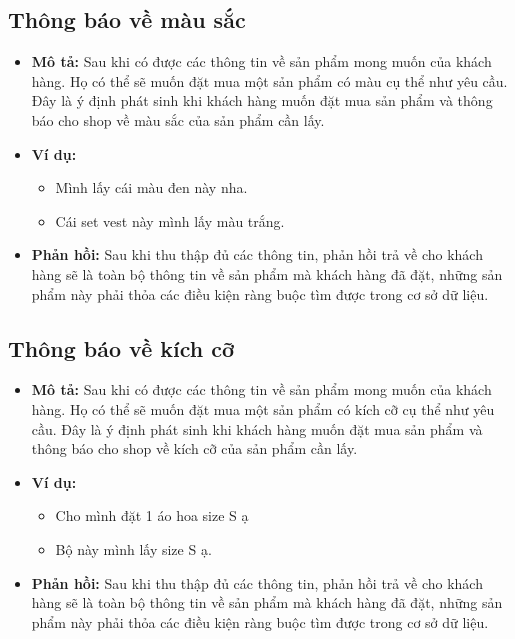 \subsection{Thông báo về màu sắc}
\begin{itemize}
    \item \textbf{Mô tả:} Sau khi có được các thông tin về sản phẩm mong muốn của khách hàng. Họ có thể sẽ muốn đặt mua một sản phẩm có màu cụ thể như yêu cầu. Đây là ý định phát sinh khi khách hàng muốn đặt mua sản phẩm và thông báo cho shop về màu sắc của sản phẩm cần lấy.
    \item \textbf{Ví dụ:}
    \begin{itemize}
        \item Mình lấy cái màu đen này nha.
        \item Cái set vest này mình lấy màu trắng.
    \end{itemize}
    \item \textbf{Phản hồi:} Sau khi thu thập đủ các thông tin, phản hồi trả về cho khách hàng sẽ là toàn bộ thông tin về sản phẩm mà khách hàng đã đặt, những sản phẩm này phải thỏa các điều kiện ràng buộc tìm được trong cơ sở dữ liệu.
\end{itemize}

\subsection{Thông báo về kích cỡ}
\begin{itemize}
    \item \textbf{Mô tả:} Sau khi có được các thông tin về sản phẩm mong muốn của khách hàng. Họ có thể sẽ muốn đặt mua một sản phẩm có kích cỡ cụ thể như yêu cầu. Đây là ý định phát sinh khi khách hàng muốn đặt mua sản phẩm và thông báo cho shop về kích cỡ của sản phẩm cần lấy.
    \item \textbf{Ví dụ:}
    \begin{itemize}
        \item Cho mình đặt 1 áo hoa size S ạ
        \item Bộ này mình lấy size S ạ.
    \end{itemize}
    \item \textbf{Phản hồi:} Sau khi thu thập đủ các thông tin, phản hồi trả về cho khách hàng sẽ là toàn bộ thông tin về sản phẩm mà khách hàng đã đặt, những sản phẩm này phải thỏa các điều kiện ràng buộc tìm được trong cơ sở dữ liệu.
\end{itemize}

